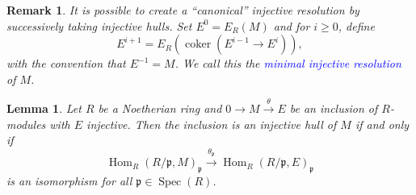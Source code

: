 \documentclass[10pt]{article}
\theoremstyle{thmstyle}
\newtheorem{lemma}[theorem]{Lemma}
\theoremstyle{defstyle}
\newtheorem{remark}[theorem]{Remark}
\newcommand{\Spec}{\operatorname{Spec}}
\newcommand{\Hom}{\operatorname{Hom}}
\newcommand{\coker}{\operatorname{coker}}
\newcommand{\frakp}{\mathfrak{p}} %
\newcommand{\define}[1]{\textcolor{blue}{\textit{#1}}}
\renewcommand{\ge}{\geqslant}
\begin{document}
\begin{remark}
    It is possible to create a ``canonical'' injective resolution by successively taking injective hulls. Set $E^0 = E_R(M)$ and for $i\ge 0$, define 
    \begin{equation*}
        E^{i + 1} = E_R\left(\coker\left(E^{i - 1}\to E^i\right)\right),
    \end{equation*}
    with the convention that $E^{-1} = M$. We call this the \define{minimal injective resolution} of $M$.
\end{remark}

\begin{lemma}
    Let $R$ be a Noetherian ring and $0\to M\xrightarrow{\theta} E$ be an inclusion of $R$-modules with $E$ injective. Then the inclusion is an injective hull of $M$ if and only if 
    \begin{equation*}
        \Hom_R\left(R/\frakp, M\right)_\frakp\xrightarrow{\theta_\frakp}\Hom_R\left(R/\frakp, E\right)_\frakp
    \end{equation*}
    is an isomorphism for all $\frakp\in\Spec(R)$.
\end{lemma}
\end{document}
